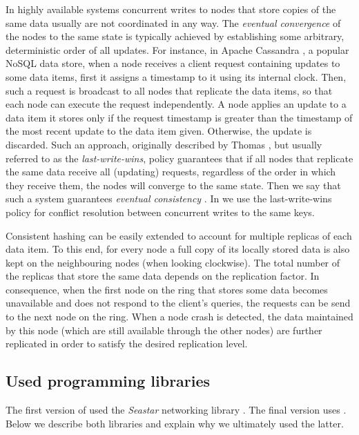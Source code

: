         In highly available systems concurrent writes to nodes that store copies of the same data usually are not coordinated in any way. The \emph{eventual convergence} of the nodes to the same state is typically achieved by establishing some arbitrary, deterministic order of all updates. For instance, in Apache Cassandra \cite{Cassandra}, a popular NoSQL data store, when a node receives a client request containing updates to some data items, first it assigns a timestamp to it using its internal clock. Then, such a request is broadcast to all nodes that replicate the data items, so that each node can execute the request independently. A node applies an update to a data item it stores only if the request timestamp is greater than the timestamp of the most recent update to the data item given. Otherwise, the update is discarded. Such an approach, originally described by Thomas \cite{Tho79}, but usually referred to as the \emph{last-write-wins}, policy guarantees that if all nodes that replicate the same data receive all (updating) requests, regardless of the order in which they receive them, the nodes will converge to the same state. Then we say that such a system guarantees \emph{eventual consistency} \cite{V09}. In \DHTS we use the last-write-wins policy for conflict resolution between concurrent writes to the same keys.
        
        Consistent hashing can be easily extended to account for multiple replicas of each data item. To this end, for every node a full copy of its locally stored data is also kept on the neighbouring nodes (when looking clockwise). The total number of the replicas that store the same data depends on the replication factor. In consequence, when the first node on the ring that stores some data becomes unavailable and does not respond to the client's queries, the requests can be send to the next node on the ring. When a node crash is detected, the data maintained by this node (which are still available through the other nodes) are further replicated in order to satisfy the desired replication level.
        
    \subsection{Used programming libraries}
        The first version of \DHTS used the \emph{Seastar} networking library \cite{Seastar}. The final version uses \Asio\cite{Asio}. Below we describe both libraries and explain why we ultimately used the latter.
    
